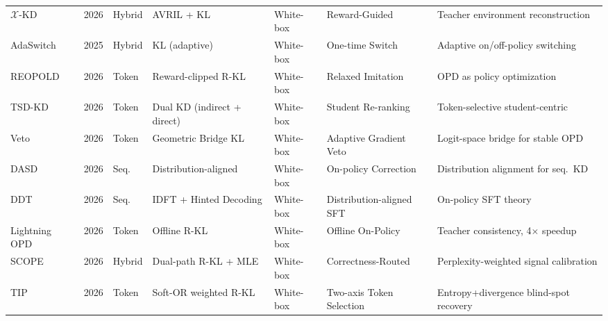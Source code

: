 \documentclass{article} %
\begin{document}
\begin{table}[t]
{\begin{tabular}{@{}lclllll@{}}
        $\mathcal{X}$-KD \citep{2602.12674} & 2026 & Hybrid & AVRIL + KL  & White-box & Reward-Guided  & Teacher environment reconstruction \\
        AdaSwitch \citep{2510.07842}   & 2025 & Hybrid & KL (adaptive)      & White-box & One-time Switch       & Adaptive on/off-policy switching \\
        REOPOLD \citep{2603.11137}     & 2026 & Token  & Reward-clipped R-KL & White-box & Relaxed Imitation    & OPD as policy optimization \\
        TSD-KD \citep{2603.13260}      & 2026 & Token  & Dual KD (indirect + direct) & White-box & Student Re-ranking & Token-selective student-centric \\
        Veto \citep{2601.07155}        & 2026 & Token  & Geometric Bridge KL & White-box & Adaptive Gradient Veto & Logit-space bridge for stable OPD \\
        DASD \citep{2601.09088}        & 2026 & Seq.   & Distribution-aligned & White-box & On-policy Correction & Distribution alignment for seq.\ KD \\
        DDT \citep{2602.12222}         & 2026 & Seq.   & IDFT + Hinted Decoding & White-box & Distribution-aligned SFT & On-policy SFT theory \\
        Lightning OPD \citep{wu2026lightning} & 2026 & Token  & Offline R-KL          & White-box & Offline On-Policy    & Teacher consistency, 4$\times$ speedup \\
        SCOPE \citep{zheng2026scope}    & 2026 & Hybrid & Dual-path R-KL + MLE  & White-box & Correctness-Routed   & Perplexity-weighted signal calibration \\
        TIP \citep{xu2026tip}    & 2026 & Token  & Soft-OR weighted R-KL  & White-box & Two-axis Token Selection   & Entropy+divergence blind-spot recovery \\
        \bottomrule
    \end{tabular}
    }
\end{table}
\end{document}

